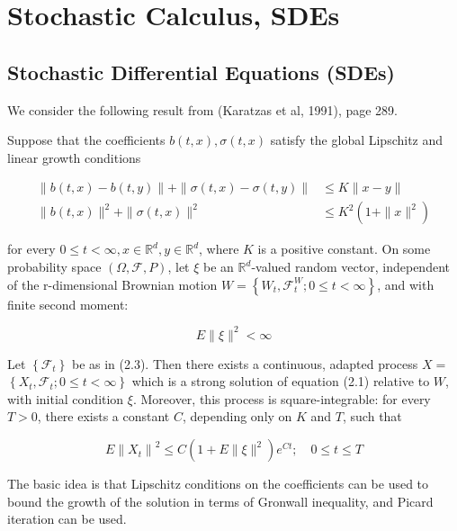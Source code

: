 \section{Stochastic Calculus, SDEs}

\subsection{Stochastic Differential Equations (SDEs)}

We consider the following result from (Karatzas et al, 1991), page 289.
\begin{theorem}
    
    Suppose that the coefficients $b(t, x), \sigma(t, x)$ satisfy the global Lipschitz and linear growth conditions

\[
\begin{aligned}
\|b(t, x)-b(t, y)\|+\|\sigma(t, x)-\sigma(t, y)\| & \leq K\|x-y\| \\
\|b(t, x)\|^2+\|\sigma(t, x)\|^2 & \leq K^2\left(1+\|x\|^2\right)
\end{aligned}
\]

for every $0 \leq t<\infty, x \in \mathbb{R}^d, y \in \mathbb{R}^d$, where $K$ is a positive constant. On some probability space $(\Omega, \mathscr{F}, P)$, let $\xi$ be an $\mathbb{R}^d$-valued random vector, independent of the r-dimensional Brownian motion $W=\left\{W_t, \mathscr{F}_t^W ; 0 \leq t<\infty\right\}$, and with finite second moment:

\[
E\|\xi\|^2<\infty
\]


Let $\left\{\mathscr{F}_t\right\}$ be as in (2.3). Then there exists a continuous, adapted process $X=$ $\left\{X_t, \mathscr{F}_t ; 0 \leq t<\infty\right\}$ which is a strong solution of equation (2.1) relative to $W$, with initial condition $\xi$. Moreover, this process is square-integrable: for every $T>0$, there exists a constant $C$, depending only on $K$ and $T$, such that

\[
E\left\|X_t\right\|^2 \leq C\left(1+E\|\xi\|^2\right) e^{C t} ; \quad 0 \leq t \leq T
\]

\end{theorem}
The basic idea is that Lipschitz conditions on the coefficients can be used to bound the growth of the solution in terms of Gronwall inequality, and Picard iteration can be used.

